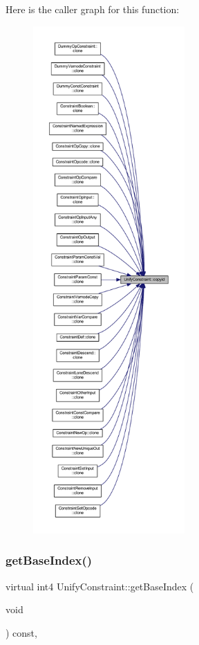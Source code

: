 Here is the caller graph for this function\+:
\nopagebreak
\begin{figure}[H]
\begin{center}
\leavevmode
\includegraphics[height=550pt]{class_unify_constraint_ad437d193c74ae8e03077da359df718c2_icgraph}
\end{center}
\end{figure}
\mbox{\label{class_unify_constraint_a44f0164f38ac1fdc44fc73ebe7678de1}} 
\subsubsection{\texorpdfstring{getBaseIndex()}{getBaseIndex()}}
{\footnotesize\ttfamily virtual int4 Unify\+Constraint\+::get\+Base\+Index (\begin{DoxyParamCaption}\item[{void}]{ }\end{DoxyParamCaption}) const\hspace{0.3cm}{\ttfamily [inline]}, {\ttfamily [virtual]}}



